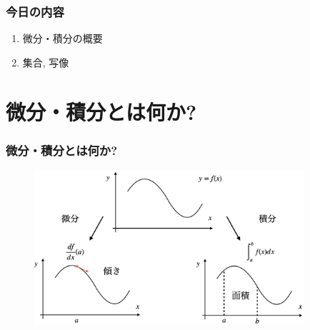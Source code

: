 


\begin{frame}
\frametitle{今日の内容}



\begin{enumerate}
\item 微分・積分の概要
\item 集合, 写像
\end{enumerate}


\end{frame}





\section{微分・積分とは何か?}


\begin{frame}
\frametitle{微分・積分とは何か?}


 \begin{figure}[htbp]
 \begin{center} 
  \includegraphics[width=100mm]{calculus1/diff_int.png}
 \end{center}
\end{figure}

\end{frame}




